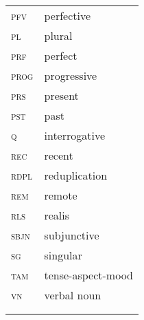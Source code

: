 \documentclass[output=paper]{langsci/langscibook}
\begin{document}
\begin{tabularx}{.33\textwidth}{ll}
\textsc{pfv}  & perfective  \\
\textsc{pl}  & plural\\
\textsc{prf}  & perfect  \\
\textsc{prog}  & progressive \\ 
\textsc{prs}  & present\\
\textsc{pst}  & past  \\
\textsc{q}  & interrogative\\  
\textsc{rec}  & recent\\
\textsc{rdpl}  &reduplication  \\
\textsc{rem}  & remote  \\
\textsc{rls}  & realis\\
\textsc{sbjn}  & subjunctive\\  
\textsc{sg}  & singular  \\
\textsc{tam}  & tense-aspect-mood \textsc{}\\
\textsc{vn    }   & verbal noun\\
\\
\\
\end{tabularx}
\end{document}
